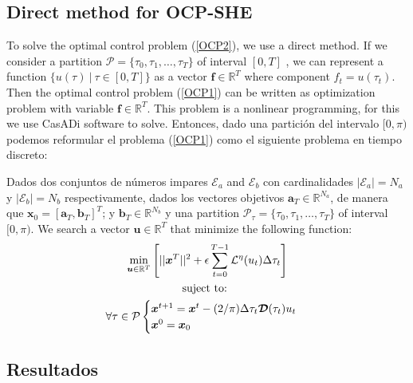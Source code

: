 \subsection{Direct method  for  OCP-SHE}

To solve the optimal control problem (\ref{OCP2}), we use a direct method. 
If we consider a partition $\mathcal{P} = \{\tau_0,\tau_1,\dots,\tau_{T}\}$ of interval $[0,T]$ , we can represent a function $\{ u(\tau) \ | \ \tau \in [0,T]\}$ as a vector $\bm{f} \in \mathbb{R}^{T}$ where component $f_t = u(\tau_t)$. Then the optimal control problem (\ref{OCP1}) can be written as optimization problem with variable $\bm{f} \in \mathbb{R}^{T}$. This problem is a nonlinear programming, for this we use CasADi software to solve. Entonces, dado una partición del intervalo $[0,\pi)$ podemos reformular el problema (\ref{OCP1}) como el siguiente problema en tiempo discreto:
\newline
\begin{problem}
    Dados dos conjuntos de números impares $\mathcal{E}_a$ and $\mathcal{E}_b$ con cardinalidades $|\mathcal{E}_a| = N_a$ y  $|\mathcal{E}_b| = N_b$ respectivamente, dados los vectores objetivos $\bm{a}_T  \in \mathbb{R}^{N_a}$, de manera que $\bm{x}_0 = [\bm{a}_T,\bm{b}_T]^T$; y $\bm{b}_T  \in \mathbb{R}^{N_b}$ y una  partition $\mathcal{P}_\tau = \{\tau_0,\tau_1,\dots,\tau_{T}\}$ of interval $[0,\pi)$. We search a vector $\bm{u} \in \mathbb{R}^{T}$ that minimize the following function:
    \begin{gather}
        \min_{\bm{u} \in \mathbb{R}^{T} } 
        \Bigg[ 
        || \bm{x}^{T}||^2
        + \epsilon  \sum_{t=0}^{T-1} \mathcal{L}^\eta(u_{t}) \Delta\tau_t  \Bigg]  \\
        \notag \text{suject to: } \\
        \forall \tau \in \mathcal{P} \begin{cases}
            \bm{x}^{t+1} = \bm{x}^{t} - (2/\pi)\Delta \tau_t \bm{\mathcal{D}}(\tau_t)u_t \\
            \bm{x}^0 = \bm{x}_0
        \end{cases} 
    \end{gather}
\end{problem}



\subsection{Resultados}

